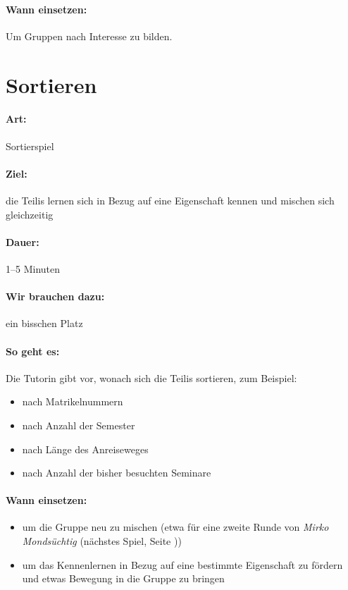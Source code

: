 \paragraph{Wann einsetzen:} Um Gruppen nach Interesse zu bilden.

\section{Sortieren}
\label{sortieren}
\paragraph{Art:} Sortierspiel
\paragraph{Ziel:} die Teilis lernen sich in Bezug auf eine Eigenschaft kennen und mischen sich gleichzeitig
\paragraph{Dauer:} 1--5 Minuten
\paragraph{Wir brauchen dazu:} ein bisschen Platz
\paragraph{So geht es:} Die Tutorin gibt vor, wonach sich die Teilis sortieren, zum Beispiel:
	\begin{itemize}
		\item nach Matrikelnummern
		\item nach Anzahl der Semester
		\item nach Länge des Anreiseweges
		\item nach Anzahl der bisher besuchten Seminare
	\end{itemize}
\paragraph{Wann einsetzen:}
\begin{itemize}
	\item um die Gruppe neu zu mischen (etwa für eine zweite Runde von \emph{Mirko Mondsüchtig} (nächstes Spiel, Seite \pageref{mirko}))
	\item um das Kennenlernen in Bezug auf eine bestimmte Eigenschaft zu fördern und etwas Bewegung in die Gruppe zu bringen
\end{itemize}

